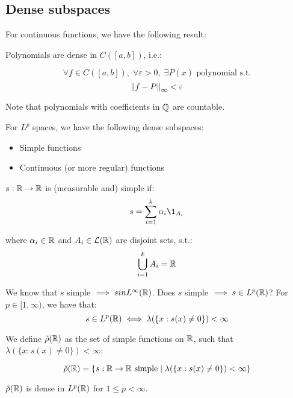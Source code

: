 \subsection{Dense subspaces}

For continuous functions, we have the following result:\\

\begin{ftheorem}
    Polynomials are dense in $C([a, b])$, i.e.:

    $$\forall f \in C([a, b]), \; \forall \varepsilon > 0, \; \exists P(x) \text{ polynomial s.t.}$$
    $$\left\|f - P\right\|_{\infty} < \varepsilon$$

    Note that polynomials with coefficients in $\mathbb{Q}$ are countable.
\end{ftheorem}
\vspace{1em}

For $L^p$ spaces, we have the following dense subspaces:
\begin{itemize}
    \item Simple functions
    \item Continuous (or more regular) functions
\end{itemize}

\begin{note}[Recall]
    $s: \mathbb{R} \to \mathbb{R}$ is (measurable and) simple if:
    $$s = \sum_{i=1}^k \alpha_i \1_{A_i}$$

    where $\alpha_i \in \mathbb{R}$ and $A_i \in \mathcal{L}(\mathbb{R})$ are disjoint sets, s.t.:
    $$\bigcup_{i=1}^k A_i = \mathbb{R}$$

    We know that $s$ simple $\implies s in L^{\infty}(\mathbb{R})$. Does $s$ simple $\implies s \in L^p(\mathbb{R})$?
    For $p \in [1, \infty)$, we have that:
    $$s \in L^p(\mathbb{R}) \iff \lambda(\{x: s(x) \neq 0\}) < \infty$$

\end{note}

\begin{fdefinition}
    We define $\tilde{\rho}(\mathbb{R})$ as the set of simple functions on $\mathbb{R}$,
    such that $\lambda(\{x: s(x) \neq 0\}) < \infty$:

    $$\tilde{\rho}(\mathbb{R}) = \{s: \mathbb{R} \to \mathbb{R} \text{ simple} \; | \; \lambda(\{x: s(x) \neq 0\}) < \infty\}$$
\end{fdefinition}

\begin{ftheorem}
    $\tilde{\rho}(\mathbb{R})$ is dense in $L^p(\mathbb{R})$ for $1 \leq p < \infty$.
\end{ftheorem}


